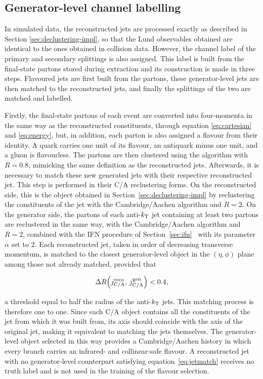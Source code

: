 \subsection{Generator-level channel labelling}
\label{sec:genlevel}

In simulated data, the reconstructed jets are processed exactly as described in Section \ref{sec:declustering-impl},
so that the Lund observables obtained are identical to the ones obtained in collision data.
However, the channel label of the primary and secondary splittings is also assigned. This 
label is built from the final-state partons stored during extraction and its construction
is made in three steps. Flavoured jets are first built from the
partons, these generator-level jets are then matched to the reconstructed jets,
and finally the splittings of the two are matched and labelled.

Firstly, the final-state partons of each event are converted into four-momenta in the same 
way as the reconstructed constituents, through equation \eqref{eq:cartesian} and \eqref{eq:energy},
but, in addition, each parton is also assigned a flavour from their identity. A quark
carries one unit of its flavour, an antiquark minus one unit, and a gluon is
flavourless. The partons are then clustered using the \antikt{} algorithm with $R=0.8$, mimicking
the same definition as the reconstructed jets. Afterwards, it is necessary to match these new generated jets
with their respective reconstructed jet. This step is performed in their C/A reclustering forms.
On the reconstructed side, this is the object
obtained in Section~\ref{sec:declustering-impl} by reclustering the constituents
of the jet with the Cambridge/Aachen algorithm and $R = 2$. On the generator side,
the partons of each anti-$k_{\mathrm{T}}$ jet containing at least two partons are reclustered
in the same way, with the Cambridge/Aachen algorithm and $R = 2$, combined with the
IFN procedure of Section~\ref{sec:ifn}~\cite{caola2023flavouredjetsexactantikt} with its parameter
$\alpha$ set to $2$. Each reconstructed jet, taken in order of decreasing
transverse momentum, is matched to the closest generator-level object in the
$(\eta,\phi)$ plane among those not already matched, provided that

\begin{equation}
  \Delta R\!\left( j^{\text{reco}}_{\text{C/A}},\, j^{\text{gen}}_{\text{C/A}} \right)
  < 0.4 ,
  \label{eq:jetmatch}
\end{equation}

a threshold equal to half the radius of the anti-$k_{\mathrm{T}}$ jets. This matching process is therefore
one to one. Since each C/A object contains all the constituents of the \antikt{} jet from which it was built
from, its axis should coincide with the axis of the original jet, making it equivalent
to matching the \antikt{} jets themselves. The generator-level object selected in this way
provides a Cambridge/Aachen history in which every branch carries an infrared-
and collinear-safe flavour. A reconstructed jet with no generator-level
counterpart satisfying equation~\eqref{eq:jetmatch} receives no truth label and is not
used in the training of the flavour selection.

